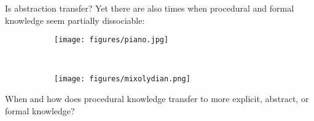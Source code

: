 \documentclass{beamer}
\begin{document}
\begin{frame}{Is abstraction transfer?}
Yet there are also times when procedural and formal knowledge seem partially dissociable:
\begin{figure}
\centering
\begin{subfigure}{0.4\textwidth}
\texttt{[image: figures/piano.jpg]}
\end{subfigure}~%
\begin{subfigure}{0.5\textwidth}
\texttt{[image: figures/mixolydian.png]}
\end{subfigure}%
\end{figure}
\note{}
\end{frame}

\begin{frame}[standout]
When and how does procedural knowledge transfer to more explicit, abstract, or formal knowledge?
\end{frame}
\end{document}
